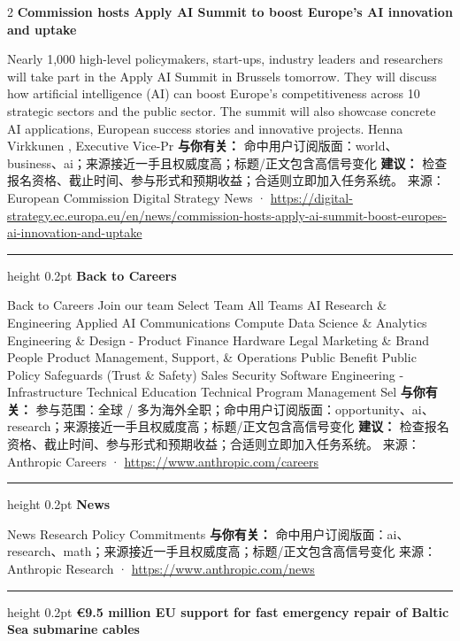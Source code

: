 \documentclass[10.5pt]{ctexart}
\begin{document}
\begin{multicols}{2}
{\large\bfseries Commission hosts Apply AI Summit to boost Europe’s AI innovation and uptake}\par
Nearly 1,000 high-level policymakers, start-ups, industry leaders and researchers will take part in the Apply AI Summit in Brussels tomorrow. They will discuss how artificial intelligence (AI) can boost Europe’s competitiveness across 10 strategic sectors and the public sector. The summit will also showcase concrete AI applications, European success stories and innovative projects. Henna Virkkunen , Executive Vice-Pr
\textbf{与你有关：} 命中用户订阅版面：world、business、ai；来源接近一手且权威度高；标题/正文包含高信号变化
\textbf{建议：} 检查报名资格、截止时间、参与形式和预期收益；合适则立即加入任务系统。
{\footnotesize\color{ormuted} 来源：European Commission Digital Strategy News · \url{https://digital-strategy.ec.europa.eu/en/news/commission-hosts-apply-ai-summit-boost-europes-ai-innovation-and-uptake}}
\vspace{2mm}
\hrule height 0.2pt
\vspace{2mm}
{\large\bfseries Back to Careers}\par
Back to Careers Join our team Select Team All Teams AI Research \& Engineering Applied AI Communications Compute Data Science \& Analytics Engineering \& Design - Product Finance Hardware Legal Marketing \& Brand People Product Management, Support, \& Operations Public Benefit Public Policy Safeguards (Trust \& Safety) Sales Security Software Engineering - Infrastructure Technical Education Technical Program Management Sel
\textbf{与你有关：} 参与范围：全球 / 多为海外全职；命中用户订阅版面：opportunity、ai、research；来源接近一手且权威度高；标题/正文包含高信号变化
\textbf{建议：} 检查报名资格、截止时间、参与形式和预期收益；合适则立即加入任务系统。
{\footnotesize\color{ormuted} 来源：Anthropic Careers · \url{https://www.anthropic.com/careers}}
\vspace{2mm}
\hrule height 0.2pt
\vspace{2mm}
{\large\bfseries News}\par
News Research Policy Commitments
\textbf{与你有关：} 命中用户订阅版面：ai、research、math；来源接近一手且权威度高；标题/正文包含高信号变化
{\footnotesize\color{ormuted} 来源：Anthropic Research · \url{https://www.anthropic.com/news}}
\vspace{2mm}
\hrule height 0.2pt
\vspace{2mm}
{\large\bfseries €9.5 million EU support for fast emergency repair of Baltic Sea submarine cables}\par

\end{multicols}
\end{document}

